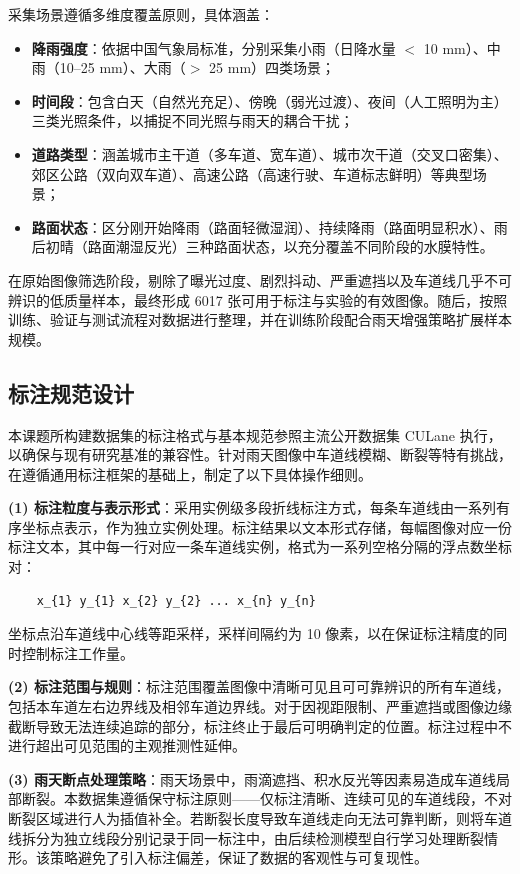 采集场景遵循多维度覆盖原则，具体涵盖：
\begin{itemize}[leftmargin=2em]
	\item \textbf{降雨强度}：依据中国气象局标准，分别采集小雨（日降水量 $<$ 10 mm）、中雨（10--25 mm）、大雨（$>$ 25 mm）四类场景；
	\item \textbf{时间段}：包含白天（自然光充足）、傍晚（弱光过渡）、夜间（人工照明为主）三类光照条件，以捕捉不同光照与雨天的耦合干扰；
	\item \textbf{道路类型}：涵盖城市主干道（多车道、宽车道）、城市次干道（交叉口密集）、郊区公路（双向双车道）、高速公路（高速行驶、车道标志鲜明）等典型场景；
	\item \textbf{路面状态}：区分刚开始降雨（路面轻微湿润）、持续降雨（路面明显积水）、雨后初晴（路面潮湿反光）三种路面状态，以充分覆盖不同阶段的水膜特性。
\end{itemize}

在原始图像筛选阶段，剔除了曝光过度、剧烈抖动、严重遮挡以及车道线几乎不可辨识的低质量样本，最终形成 6017 张可用于标注与实验的有效图像。随后，按照训练、验证与测试流程对数据进行整理，并在训练阶段配合雨天增强策略扩展样本规模。


\subsection{标注规范设计}

本课题所构建数据集的标注格式与基本规范参照主流公开数据集 CULane\cite{pan2018spatial} 执行，以确保与现有研究基准的兼容性。针对雨天图像中车道线模糊、断裂等特有挑战，在遵循通用标注框架的基础上，制定了以下具体操作细则。

\textbf{(1) 标注粒度与表示形式}：采用实例级多段折线标注方式，每条车道线由一系列有序坐标点表示，作为独立实例处理。标注结果以文本形式存储，每幅图像对应一份标注文本，其中每一行对应一条车道线实例，格式为一系列空格分隔的浮点数坐标对：
\begin{verbatim}
	x_{1} y_{1} x_{2} y_{2} ... x_{n} y_{n}
\end{verbatim}
坐标点沿车道线中心线等距采样，采样间隔约为 10 像素，以在保证标注精度的同时控制标注工作量。

\textbf{(2) 标注范围与规则}：标注范围覆盖图像中清晰可见且可可靠辨识的所有车道线，包括本车道左右边界线及相邻车道边界线。对于因视距限制、严重遮挡或图像边缘截断导致无法连续追踪的部分，标注终止于最后可明确判定的位置。标注过程中不进行超出可见范围的主观推测性延伸。

\textbf{(3) 雨天断点处理策略}：雨天场景中，雨滴遮挡、积水反光等因素易造成车道线局部断裂。本数据集遵循保守标注原则——仅标注清晰、连续可见的车道线段，不对断裂区域进行人为插值补全。若断裂长度导致车道线走向无法可靠判断，则将车道线拆分为独立线段分别记录于同一标注中，由后续检测模型自行学习处理断裂情形。该策略避免了引入标注偏差，保证了数据的客观性与可复现性。

